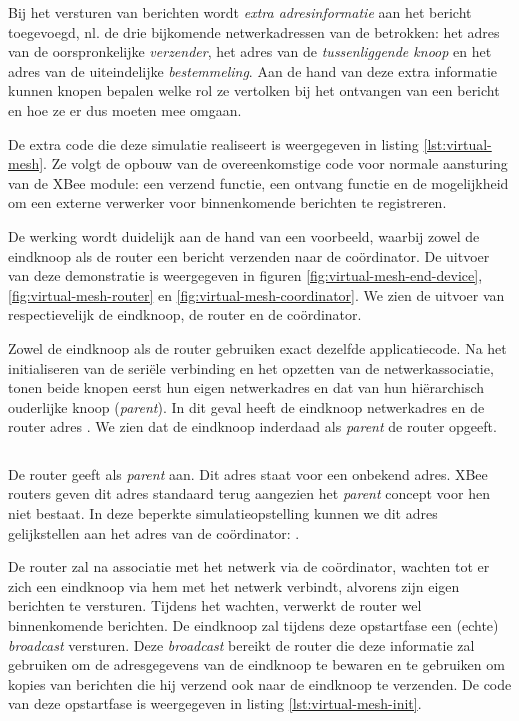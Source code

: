 Bij het versturen van berichten wordt \emph{extra adresinformatie} aan het
bericht toegevoegd, nl. de drie bijkomende netwerkadressen van de betrokken:
het adres van de oorspronkelijke \emph{verzender}, het adres van de
\emph{tussenliggende knoop} en het adres van de uiteindelijke
\emph{bestemmeling}. Aan de hand van deze extra informatie kunnen knopen
bepalen welke rol ze vertolken bij het ontvangen van een bericht en hoe ze er
dus moeten mee omgaan.

De extra code die deze simulatie realiseert is weergegeven in listing
\ref{lst:virtual-mesh}. Ze volgt de opbouw van de overeenkomstige code voor
normale aansturing van de XBee module: een verzend functie, een ontvang functie
en de mogelijkheid om een externe verwerker voor binnenkomende berichten te
registreren.

De werking wordt duidelijk aan de hand van een voorbeeld, waarbij zowel de
eindknoop als de router een bericht verzenden naar de co\"ordinator. De
uitvoer van deze demonstratie is weergegeven in figuren
\ref{fig:virtual-mesh-end-device}, \ref{fig:virtual-mesh-router} en
\ref{fig:virtual-mesh-coordinator}. We zien de uitvoer van respectievelijk de
eindknoop, de router en de co\"ordinator.

Zowel de eindknoop als de router gebruiken exact dezelfde applicatiecode. Na
het initialiseren van de seri\"ele verbinding en het opzetten van de
netwerkassociatie, tonen beide knopen eerst hun eigen netwerkadres en dat van
hun hi\"erarchisch ouderlijke knoop (\emph{parent}). In dit geval heeft
de eindknoop netwerkadres  en de router adres . We zien
dat de eindknoop inderdaad als \emph{parent} de router opgeeft.

\inputminted[linenos,frame=lines,framesep=2mm,fontsize=\footnotesize,firstline=97,firstnumber=97]{c}{../src/demo/lib/network.c}
\vspace{-5mm}
\vspace{3mm}

De router geeft als \emph{parent}  aan. Dit adres staat voor een
onbekend adres. XBee routers geven dit adres standaard terug aangezien het
\emph{parent} concept voor hen niet bestaat. In deze beperkte
simulatieopstelling kunnen we dit adres gelijkstellen aan het adres van de
co\"ordinator: .

De router zal na associatie met het netwerk via de co\"ordinator, wachten tot er
zich een eindknoop via hem met het netwerk verbindt, alvorens zijn eigen
berichten te versturen. Tijdens het wachten, verwerkt de router wel
binnenkomende berichten. De eindknoop zal tijdens deze opstartfase een (echte)
\emph{broadcast} versturen. Deze \emph{broadcast} bereikt de router die deze
informatie zal gebruiken om de adresgegevens van de eindknoop te bewaren en te
gebruiken om kopies van berichten die hij verzend ook naar de eindknoop te
verzenden. De code van deze opstartfase is weergegeven in listing
\ref{lst:virtual-mesh-init}.

